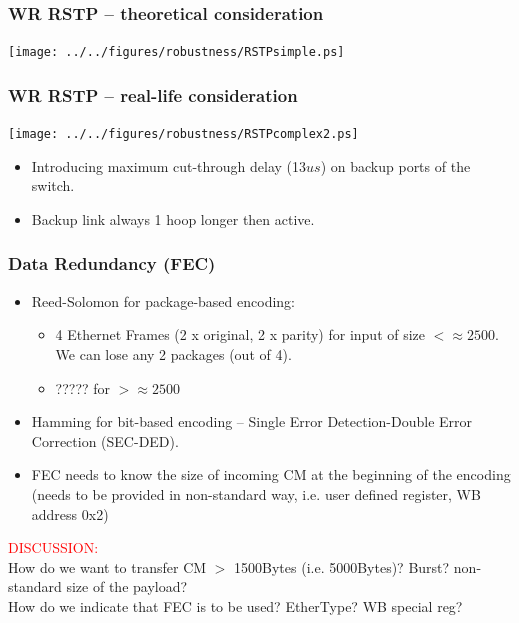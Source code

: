 \documentclass[]{beamer}
\begin{document}
\begin{frame}
  \frametitle{WR RSTP -- theoretical consideration}   

\centering
\texttt{[image: ../../figures/robustness/RSTPsimple.ps]}

\end{frame}
\begin{frame}
  \frametitle{WR RSTP -- real-life consideration}   

\centering
\texttt{[image: ../../figures/robustness/RSTPcomplex2.ps]}

  \begin{itemize}
    \item Introducing maximum cut-through delay (13$us$) on backup ports of the
          switch.
    \item Backup link always 1 hoop longer then active.
  \end{itemize}

\end{frame}
\begin{frame}
  \frametitle{Data Redundancy (FEC)}   

      \begin{itemize}
      \item Reed-Solomon for package-based encoding:
	\begin{itemize}
	\item  4 Ethernet Frames (2 x original, 2 x parity) for input of size 
	      $<\approx2500$. We can lose any 2 packages (out of 4).
	\item  ????? for $>\approx2500$
	\end{itemize}
      \item Hamming for bit-based encoding -- Single Error Detection-Double
	    Error Correction (SEC-DED).
      \item FEC needs to know the size of incoming CM at the beginning of the
	  encoding (needs to be provided in non-standard way, i.e. user defined
	  register, WB address 0x2)
      \end{itemize}

\centering
\textcolor{red}{DISCUSSION:} \\
{\small
How do we want to transfer CM $>$ 1500Bytes (i.e. 5000Bytes)? Burst?
non-standard size of the payload? \\
How do we indicate that FEC is to be used? EtherType? WB special reg? 
}
\end{frame}
\end{document}
